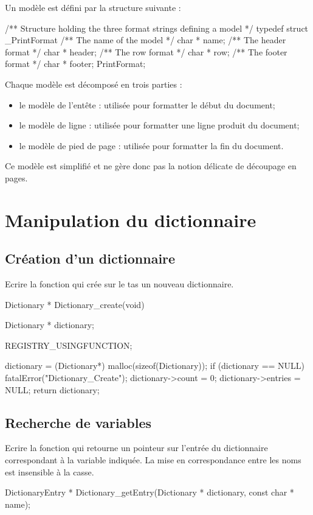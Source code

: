 Un modèle est défini par la structure suivante :
\begin{csource}

/** Structure holding the three format strings defining a model */
typedef struct _PrintFormat {
    /** The name of the model */
    char * name;
    /** The header format */
    char * header;
    /** The row format */
    char * row;
    /** The footer format */
    char * footer;
} PrintFormat;
\end{csource}
Chaque modèle est décomposé en trois parties :
\begin{itemize}
  \item le modèle de l'entête : utilisée pour formatter le début du document;
  \item le modèle de ligne : utilisée pour formatter une ligne produit du document;
  \item le modèle de pied de page : utilisée pour formatter la fin du document.
\end{itemize}
Ce modèle est simplifié et ne gère donc pas la notion délicate de découpage en pages.

\section{Manipulation du dictionnaire}

\subsection{Création d'un dictionnaire}

Ecrire la fonction  qui crée sur le tas un nouveau dictionnaire.

\begin{csourcecorrection}
Dictionary * Dictionary_create(void) {
    Dictionary * dictionary;

    REGISTRY_USINGFUNCTION;

    dictionary = (Dictionary*) malloc(sizeof(Dictionary));
    if (dictionary == NULL)
        fatalError("Dictionary_Create");
    dictionary->count = 0;
    dictionary->entries = NULL;
    return dictionary;
}
\end{csourcecorrection}

\subsection{Recherche de variables}

Ecrire la fonction  qui retourne un pointeur sur l'entrée du dictionnaire correspondant à la variable indiquée. La mise en correspondance entre les noms est insensible à la casse.
\begin{csource}
DictionaryEntry * Dictionary_getEntry(Dictionary * dictionary, const char * name);
\end{csource}

